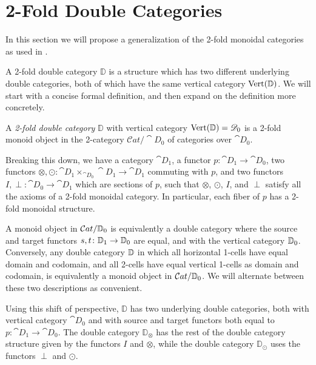 
\chapter{2-Fold Double Categories}

In this section we will propose a generalization of the 2-fold monoidal categories as used in \cite{garner:soa}.

A 2-fold double category $\mathbb{D}$ is a structure which has two different underlying double categories, both of which have the same vertical category $\operatorname{Vert}(\mathbb{D})$. We will start with a concise formal definition, and then expand on the definition more concretely.

\begin{definition}
	A \emph{2-fold double category} $\mathbb{D}$ with vertical category $\operatorname{Vert}(\mathbb{D})=\mathscr{D}_0$ is a 2-fold monoid object in the 2-category $\mathcal{C}at/\cat{D}_0$ of categories over $\cat{D}_0$.
\end{definition}

Breaking this down, we have a category $\cat{D}_1$, a functor $p\colon\cat{D}_1\to\cat{D}_0$, two functors $\otimes, \odot\colon \cat{D}_1\times_{\cat{D}_0}\cat{D}_1\to\cat{D}_1$ commuting with $p$, and two functors $I,\perp\colon\cat{D}_0\to\cat{D}_1$ which are sections of $p$, such that $\otimes$, $\odot$, $I$, and $\perp$ satisfy all the axioms of a 2-fold monoidal category. In particular, each fiber of $p$ has a 2-fold monoidal structure.

A monoid object in $\mathcal{C}at/\mathbb{D}_0$ is equivalently a double category where the source and target functors $s,t\colon \mathbb{D}_1\to \mathbb{D}_0$ are equal, and with the vertical category $\mathbb{D}_0$. Conversely, any double category $\mathbb{D}$ in which all horizontal 1-cells have equal domain and codomain, and all 2-cells have equal vertical 1-cells as domain and codomain, is equivalently a monoid object in $\mathcal{C}at/\mathbb{D}_0$. We will alternate between these two descriptions as convenient.

Using this shift of perspective, $\mathbb{D}$ has two underlying double categories, both with vertical category $\cat{D}_0$ and with source and target functors both equal to $p\colon\cat{D}_1\to\cat{D}_0$. The double category $\mathbb{D}_{\otimes}$ has the rest of the double category structure given by the functors $I$ and $\otimes$, while the double category $\mathbb{D}_{\odot}$ uses the functors $\perp$ and $\odot$.

